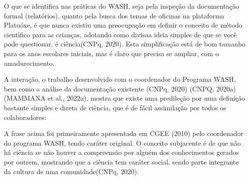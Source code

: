 \documentclass[
12pt,		%
openright,	%
twoside,  %
a4paper,			%
chapter=TITLE,		%
english,			%
french,				%
spanish,			%
brazil				%
]{USPSC-classe/USPSC}
\begin{document}
O que se identifica nas pr\'aticas do WASH, seja pela inspe\c{c}\~ao da documenta\c{c}\~ao formal (relat\'orios), quanto pela busca dos temas de oficinas na plataforma \textquotedbl Platu\'oxe\textquotedbl , \'e que nunca existiu uma preocupa\c{c}\~ao em definir o conceito de m\'etodo cient\'{\i}fico para as crian\c{c}as, adotando como \textquotedbl divisa\textquotedbl  a ideia simples de que \textquotedbl se voc\^e pode questionar, \'e ci\^encia\textquotedbl   (CNPq, 2020). Esta simplifica\c{c}\~ao est\'a de bom tamanho para os anos escolares iniciais, mas \'e claro que precisa se ampliar, com o amadurecimento.

















A intera\c{c}\~ao, o trabalho desenvolvido com o coordenador do Programa WASH, bem como a an\'alise da documenta\c{c}\~ao existente  (CNPq, 2020)  (CNPQ, 2020a)  (MAMMANA et al., 2022a), mostra que existe uma predile\c{c}\~ao por uma defini\c{c}\~ao bastante simples e direta de ci\^encia, que \'e de f\'acil assimila\c{c}\~ao por todos os colaboradores:


















\noindent\begin{center}\mbox{\centering{}}\end{center}


A frase acima foi primeiramente apresentada em  CGEE (2010) pelo coordenador do programa WASH, tendo car\'ater original. O conceito subjacente \'e de que \textquotedbl n\~ao h\'a ci\^encia se n\~ao houver a compreens\~ao por algu\'em dos conhecimentos gerados por outrem, mostrando que a ci\^encia tem car\'ater social, sendo parte integrante da cultura de uma comunidade\textquotedbl   (CNPq, 2020).
\end{document}
